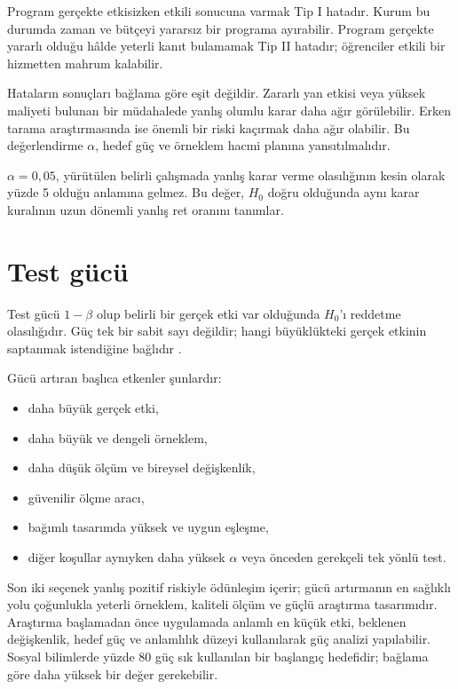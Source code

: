 Program gerçekte etkisizken etkili sonucuna varmak Tip I hatadır. Kurum bu
durumda zaman ve bütçeyi yararsız bir programa ayırabilir. Program gerçekte
yararlı olduğu hâlde yeterli kanıt bulamamak Tip II hatadır; öğrenciler etkili
bir hizmetten mahrum kalabilir.

Hataların sonuçları bağlama göre eşit değildir. Zararlı yan etkisi veya yüksek
maliyeti bulunan bir müdahalede yanlış olumlu karar daha ağır görülebilir.
Erken tarama araştırmasında ise önemli bir riski kaçırmak daha ağır olabilir.
Bu değerlendirme $\alpha$, hedef güç ve örneklem hacmi planına yansıtılmalıdır.

\begin{mistakebox}
$\alpha=0{,}05$, yürütülen belirli çalışmada yanlış karar verme olasılığının
kesin olarak yüzde 5 olduğu anlamına gelmez. Bu değer, $H_0$ doğru olduğunda
aynı karar kuralının uzun dönemli yanlış ret oranını tanımlar.
\end{mistakebox}

\section{Test gücü}

Test gücü $1-\beta$ olup belirli bir gerçek etki var olduğunda $H_0$'ı
reddetme olasılığıdır. Güç tek bir sabit sayı değildir; hangi büyüklükteki
gerçek etkinin saptanmak istendiğine bağlıdır \cite{cohen1988}.

Gücü artıran başlıca etkenler şunlardır:

\begin{itemize}
  \item daha büyük gerçek etki,
  \item daha büyük ve dengeli örneklem,
  \item daha düşük ölçüm ve bireysel değişkenlik,
  \item güvenilir ölçme aracı,
  \item bağımlı tasarımda yüksek ve uygun eşleşme,
  \item diğer koşullar aynıyken daha yüksek $\alpha$ veya önceden gerekçeli tek yönlü test.
\end{itemize}

Son iki seçenek yanlış pozitif riskiyle ödünleşim içerir; gücü artırmanın en
sağlıklı yolu çoğunlukla yeterli örneklem, kaliteli ölçüm ve güçlü araştırma
tasarımıdır. Araştırma başlamadan önce uygulamada anlamlı en küçük etki,
beklenen değişkenlik, hedef güç ve anlamlılık düzeyi kullanılarak güç analizi
yapılabilir. Sosyal bilimlerde yüzde 80 güç sık kullanılan bir başlangıç
hedefidir; bağlama göre daha yüksek bir değer gerekebilir.

